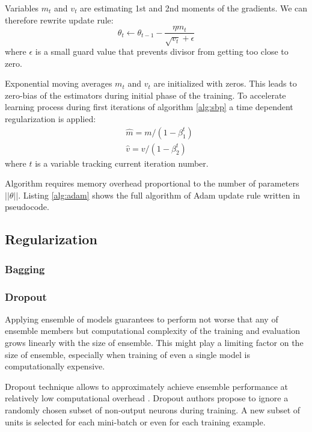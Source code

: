 Variables $m_t$ and $v_t$ are estimating 1st and 2nd moments of the gradients.
We can therefore rewrite update rule:
\begin{equation}
  \theta_t \gets \theta_{t-1} - \frac{\eta m_t}{\sqrt{v_t} + \epsilon}
\end{equation}
where $\epsilon$ is a small guard value that prevents divisor from getting too close to zero.

Exponential moving averages $m_t$ and $v_t$ are initialized with zeros.
This leads to zero-bias of the estimators during initial phase of the training.
To accelerate learning process during first iterations of algorithm \ref{alg:sbp} a time dependent regularization is applied:
\begin{equation*}
  \begin{aligned}
    & \hat{m} = m / (1-\beta_1^t) \\
    & \hat{v} = v/(1-\beta_2^t)
  \end{aligned}
\end{equation*}
where $t$ is a variable tracking current iteration number.

Algorithm requires memory overhead proportional to the number of parameters $||\theta||$. Listing \ref{alg:adam} shows the full algorithm of Adam update rule written in pseudocode.



\subsection{Regularization}

\subsubsection{Bagging}
\subsubsection{Dropout}

Applying ensemble of models guarantees to perform not worse that any of ensemble members but computational complexity of the training and evaluation grows linearly with the size of ensemble. This might play a limiting factor on the size of ensemble, especially when training of even a single model is computationally expensive.

Dropout technique allows to approximately achieve ensemble performance at relatively low computational overhead \cite{Srivastava2014}.
Dropout authors propose to ignore a randomly chosen subset of non-output neurons during training. A new subset of units is selected for each mini-batch or even for each training example.

